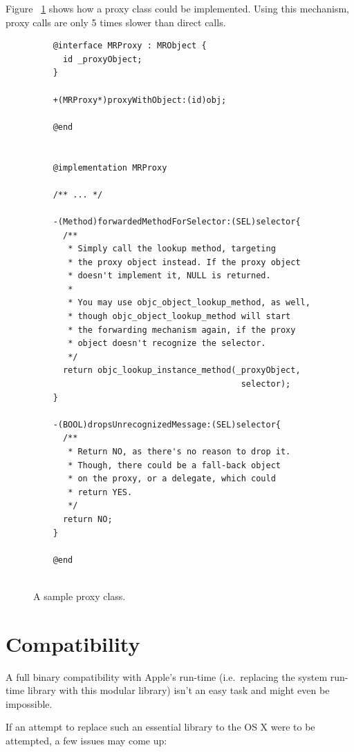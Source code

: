Figure ~\ref{fig:forwarding_proxy_class} shows how a proxy class could be implemented. Using this mechanism, proxy calls are only 5 times slower than direct calls.

\begin{figure}[H] 
  \begin{verbatim}
    @interface MRProxy : MRObject {
      id _proxyObject;
    }
    
    +(MRProxy*)proxyWithObject:(id)obj;
    
    @end
    
    
    @implementation MRProxy
    
    /** ... */
    
    -(Method)forwardedMethodForSelector:(SEL)selector{
      /** 
       * Simply call the lookup method, targeting
       * the proxy object instead. If the proxy object
       * doesn't implement it, NULL is returned.
       *
       * You may use objc_object_lookup_method, as well,
       * though objc_object_lookup_method will start
       * the forwarding mechanism again, if the proxy
       * object doesn't recognize the selector.
       */
      return objc_lookup_instance_method(_proxyObject, 
                                          selector);
    }
    
    -(BOOL)dropsUnrecognizedMessage:(SEL)selector{
      /** 
       * Return NO, as there's no reason to drop it.
       * Though, there could be a fall-back object 
       * on the proxy, or a delegate, which could 
       * return YES.
       */
      return NO;
    }
    
    @end
    
  \end{verbatim}
  \centering{}
  \caption{A sample proxy class.}
  \label{fig:forwarding_proxy_class}
\end{figure}

 

\section{Compatibility}

A full binary compatibility with Apple's run-time (i.e.\ replacing the system run-time library with this modular library) isn't an easy task and might even be impossible.

If an attempt to replace such an essential library to the OS X were to be attempted, a few issues may come up:


